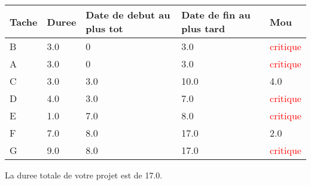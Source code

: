 \documentclass{article}
\begin{document}
\begin{tabular}{|l|l|l|l|l|}
\hline 
Tache & Duree & Date de debut au plus tot & Date de fin au plus tard & Mou\tabularnewline
\hline

B&3.0&0&3.0&\textcolor{red}{critique}\tabularnewline
\hline
A&3.0&0&3.0&\textcolor{red}{critique}\tabularnewline
\hline
C&3.0&3.0&10.0&4.0\tabularnewline
\hline
D&4.0&3.0&7.0&\textcolor{red}{critique}\tabularnewline
\hline
E&1.0&7.0&8.0&\textcolor{red}{critique}\tabularnewline
\hline
F&7.0&8.0&17.0&2.0\tabularnewline
\hline
G&9.0&8.0&17.0&\textcolor{red}{critique}\tabularnewline
\hline

\end{tabular}
La duree totale de votre projet est de 17.0.
\end{document}
